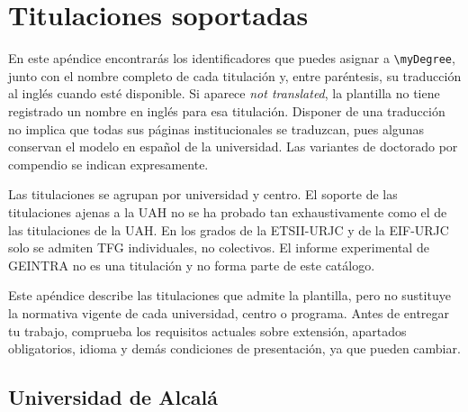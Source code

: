 %

\chapter{Titulaciones soportadas}
\label{app:titulaciones-soportadas}

En este apéndice encontrarás los identificadores que puedes asignar a \texttt{\textbackslash{}myDegree}, junto con el nombre completo de cada titulación y, entre paréntesis, su traducción al inglés cuando esté disponible. Si aparece \emph{not translated}, la plantilla no tiene registrado un nombre en inglés para esa titulación. Disponer de una traducción no implica que todas sus páginas institucionales se traduzcan, pues algunas conservan el modelo en español de la universidad. Las variantes de doctorado por compendio se indican expresamente.

Las titulaciones se agrupan por universidad y centro. El soporte de las titulaciones ajenas a la UAH no se ha probado tan exhaustivamente como el de las titulaciones de la UAH. En los grados de la ETSII-URJC y de la EIF-URJC solo se admiten TFG individuales, no colectivos. El informe experimental de GEINTRA no es una titulación y no forma parte de este catálogo.

Este apéndice describe las titulaciones que admite la plantilla, pero no sustituye la normativa vigente de cada universidad, centro o programa. Antes de entregar tu trabajo, comprueba los requisitos actuales sobre extensión, apartados obligatorios, idioma y demás condiciones de presentación, ya que pueden cambiar.

\begingroup
\section {Universidad de Alcalá}
